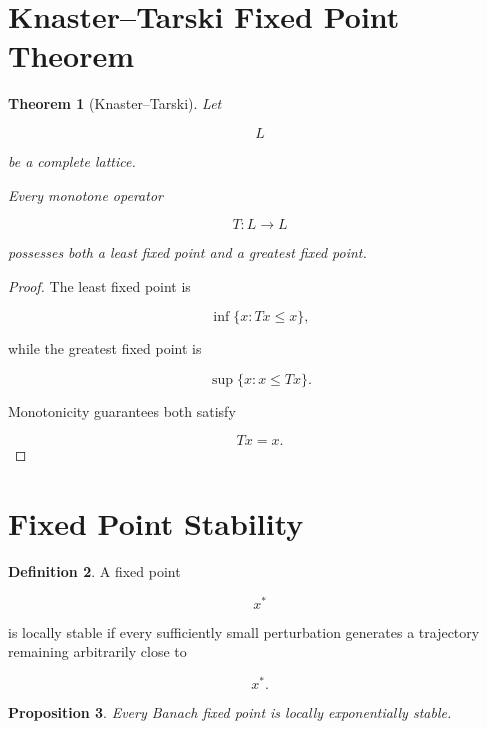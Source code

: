 \documentclass[11pt]{book}
\numberwithin{equation}{chapter}
\theoremstyle{definition}
\newtheorem{definition}{Definition}[chapter]
\theoremstyle{plain}
\newtheorem{theorem}[definition]{Theorem}
\newtheorem{proposition}[definition]{Proposition}
\begin{document}

\section{Knaster--Tarski Fixed Point Theorem}

\begin{theorem}[Knaster--Tarski]

Let

\[
L
\]

be a complete lattice.

Every monotone operator

\[
T:L\rightarrow L
\]

possesses both a least fixed point and a greatest fixed point.

\end{theorem}

\begin{proof}

The least fixed point is

\[
\inf
\{
x:
Tx\le x
\},
\]

while the greatest fixed point is

\[
\sup
\{
x:
x\le Tx
\}.
\]

Monotonicity guarantees both satisfy

\[
Tx=x.
\]

\end{proof}


\section{Fixed Point Stability}

\begin{definition}

A fixed point

\[
x^*
\]

is locally stable if every sufficiently small perturbation generates a
trajectory remaining arbitrarily close to

\[
x^*.
\]

\end{definition}


\begin{proposition}

Every Banach fixed point is locally exponentially stable.

\end{proposition}
\end{document}
